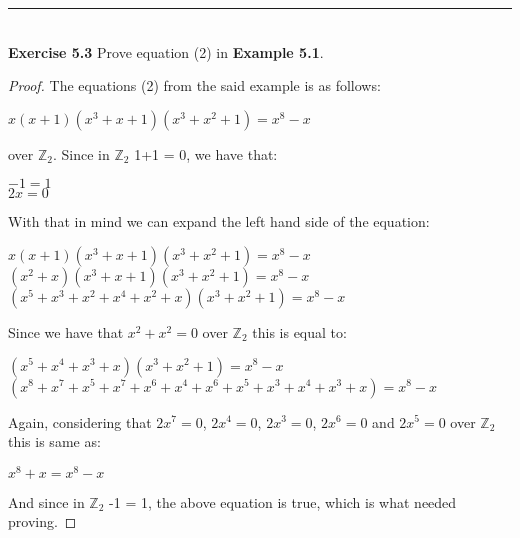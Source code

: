 \documentclass[a4paper]{article}
\begin{document}
\noindent\rule{12cm}{0.4pt}\\
\noindent \textbf{Exercise 5.3} Prove equation (2) in \textbf{Example 5.1}.
\begin{proof}
The equations (2) from the said example is as follows:
\begin{center}
$x(x + 1)(x^3 + x + 1)(x^3 + x^2 + 1) = x^8 - x$
\end{center}
over $\mathbb{Z}_{2}$. Since in $\mathbb{Z}_{2}$ 1+1 = 0, we have that:
\begin{center}
$-1 = 1$\\
$2x = 0$
\end{center}
With that in mind we can expand the left hand side of the equation:
\begin{center}
$x(x + 1)(x^3 + x + 1)(x^3 + x^2 + 1) = x^8 - x$\\
$(x^2 + x)(x^3 + x + 1)(x^3 + x^2 + 1) = x^8 - x$\\
$(x^5 + x^3 + x^2 + x^4 + x^2 + x)(x^3 + x^2 + 1) = x^8 - x$
\end{center}
Since we have that $x^2 + x^2 = 0$ over $\mathbb{Z}_{2}$ this is equal to:
\begin{center}
$(x^5 + x^4 + x^3 + x)(x^3 + x^2 + 1) = x^8 - x$\\
$(x^8 + x^7 + x^5 + x^7 + x^6 + x^4 + x^6 + x^5 + x^3 + x^4 + x^3 + x) = x^8 - x$
\end{center}
Again, considering that $2x^7=0$, $2x^4 = 0$, $2x^3 = 0$, $2x^6 = 0$ and $2x^5=0$ over $\mathbb{Z}_{2}$ this is same as:
\begin{center}
$x^8 + x = x^8 - x$
\end{center}
And since in $\mathbb{Z}_{2}$ -1 = 1, the above equation is true, which is what needed proving.
\end{proof}
\end{document}
